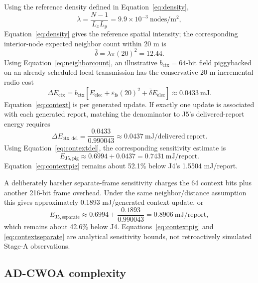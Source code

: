 \documentclass[pdflatex,sn-mathphys-num]{sn-jnl}
\begin{document}
Using the reference density defined in Equation~\eqref{eq:density},
\begin{equation}
\lambda=\frac{N-1}{L_xL_y}=9.9\times10^{-3}\ \mathrm{nodes/m^2},
\label{eq:density}
\end{equation}
Equation~\eqref{eq:density} gives the reference spatial intensity; the corresponding interior-node expected neighbor count within 20 m is
\begin{equation}
\bar{\delta}=\lambda\pi(20)^2=12.44.
\label{eq:neighborcount}
\end{equation}
Using Equation~\eqref{eq:neighborcount}, an illustrative $b_{\mathrm{ctx}}=64$-bit field piggybacked on an already scheduled local transmission has the conservative 20 m incremental radio cost
\begin{equation}
\Delta E_{\mathrm{ctx}}
=
b_{\mathrm{ctx}}
\left[
E_{\mathrm{elec}}
+\varepsilon_{\mathrm{fs}}(20)^2
+\bar{\delta}E_{\mathrm{elec}}
\right]
\approx0.0433\ \mathrm{mJ}.
\label{eq:context}
\end{equation}
Equation~\eqref{eq:context} is per generated update. If exactly one update is associated with each generated report, matching the denominator to J5's delivered-report energy requires
\begin{equation}
\Delta E_{\mathrm{ctx,del}}
=
\frac{0.0433}{0.990043}
\approx0.0437\ \mathrm{mJ/delivered\ report}.
\label{eq:contextdel}
\end{equation}
Using Equation~\eqref{eq:contextdel}, the corresponding sensitivity estimate is
\begin{equation}
E_{\mathrm{J5,pig}}
\approx0.6994+0.0437=0.7431\ \mathrm{mJ/report}.
\label{eq:contextpig}
\end{equation}
Equation~\eqref{eq:contextpig} remains about 52.1\% below J4's 1.5504 mJ/report.

A deliberately harsher separate-frame sensitivity charges the 64 context bits plus another 216-bit frame overhead. Under the same neighbor/distance assumption this gives approximately 0.1893 mJ/generated context update, or
\begin{equation}
E_{\mathrm{J5,separate}}\approx0.6994+\frac{0.1893}{0.990043}=0.8906\ \mathrm{mJ/report},
\label{eq:contextseparate}
\end{equation}
which remains about 42.6\% below J4. Equations~\eqref{eq:contextpig} and \eqref{eq:contextseparate} are analytical sensitivity bounds, not retroactively simulated Stage-A observations.

\subsection{AD-CWOA complexity}
\end{document}
